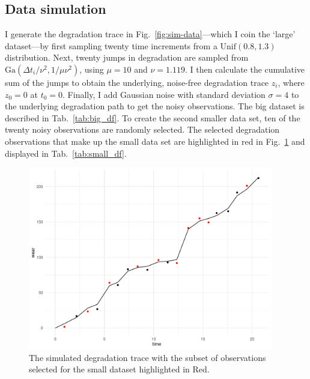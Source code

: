 \subsection{Data simulation}

I generate the degradation trace in Fig.~\ref{fig:sim-data}---which I coin the `large' dataset---by first sampling twenty time increments from a $\mbox{Unif}(0.8, 1.3)$ distribution. Next, twenty jumps in degradation are sampled from $\mbox{Ga}(\Delta t_i/\nu^2, 1/\mu\nu^2)$, using $\mu = 10$ and $\nu = 1.119$. I then calculate the cumulative sum of the jumps to obtain the underlying, noise-free degradation trace $z_i$, where $z_0 = 0$ at $t_0 = 0$. Finally, I add Gaussian noise with standard deviation $\sigma = 4$ to the underlying degradation path to get the noisy observations. The big dataset is described in Tab.~\ref{tab:big_df}. To create the second smaller data set, ten of the twenty noisy observations are randomly selected. The selected degradation observations that make up the small data set are highlighted in red in Fig.~\ref{fig:sim-data-small} and displayed in Tab.~\ref{tab:small_df}.

\begin{figure}
  \centering
  \includegraphics[width=0.95\textwidth]{./figures/ch-4/SimData_big_small.pdf}
  \caption{The simulated degradation trace with the subset of observations selected for the small dataset highlighted in Red.}
  \label{fig:sim-data-small}
\end{figure}





